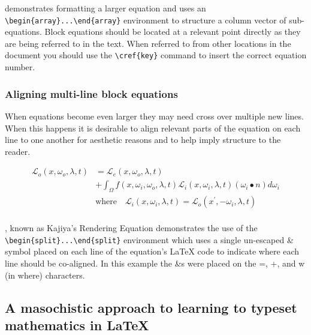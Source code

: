  demonstrates formatting a larger equation and uses an \lstinline|\begin{array}...\end{array}| environment to structure a column vector of sub-equations.
Block equations should be located at a relevant point directly as they are being referred to in the text.
When referred to from other locations in the document you should use the \lstinline|\cref{key}| command to insert the correct equation number.


		\subsubsection{Aligning multi-line block equations}

When equations become even larger they may need cross over multiple new lines.
When this happens it is desirable to align relevant parts of the equation on each line to one another for aesthetic reasons and to help imply structure to the reader. 

			\begin{equation} \label{eq:rendering_equation}
				\begin{split}
					\mathcal{L}_o\left(x, \omega_o, \lambda, t\right) &= \mathcal{L}_e\left(x, \omega_o, \lambda, t\right)\\
					&+ \int_\Omega f\left(x, \omega_i, \omega_o, \lambda, t\right) \mathcal{L}_i\left(x, \omega_i, \lambda, t\right) \left(\omega_i \bullet n\right) d\omega_i\\
					&\text{where} \quad \mathcal{L}_i\left(x, \omega_i, \lambda, t\right) = \mathcal{L}_o\left(x^\prime, -\omega_i, \lambda, t\right)\\
				\end{split}
			\end{equation}

, known as Kajiya's Rendering Equation \cite{kaj86} demonstrates the use of the \lstinline|\begin{split}...\end{split}| environment which uses a single un-escaped \& symbol placed on each line of the equation's \LaTeX{} code to indicate where each line should be co-aligned.
In this example the \&s were placed on the =, +, and w (in where) characters.


	\subsection{A masochistic approach to learning to typeset mathematics in \LaTeX{}}

